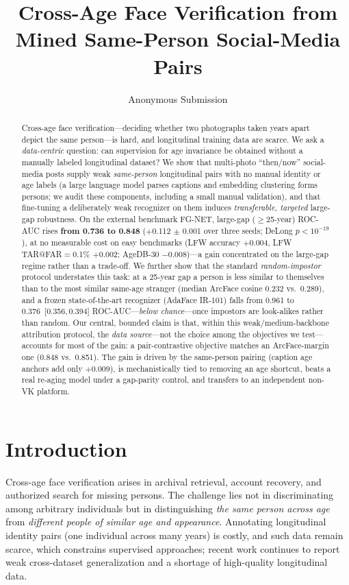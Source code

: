 \documentclass[letterpaper]{article} %
\title{Cross-Age Face Verification from Mined Same-Person Social-Media Pairs}
\author{
    Anonymous Submission
}
\begin{document}
\maketitle

\begin{abstract}
Cross-age face verification---deciding whether two photographs taken years apart depict the same person---is hard, and longitudinal training data are scarce. We ask a \emph{data-centric} question: can supervision for age invariance be obtained without a manually labeled longitudinal dataset? We show that multi-photo ``then/now'' social-media posts supply weak \emph{same-person} longitudinal pairs with no manual identity or age labels (a large language model parses captions and embedding clustering forms persons; we audit these components, including a small manual validation), and that fine-tuning a deliberately weak recognizer on them induces \emph{transferable, targeted} large-gap robustness. On the external benchmark FG-NET, large-gap ($\geq$25-year) ROC-AUC rises \textbf{from 0.736 to 0.848} ($+$0.112 $\pm$ 0.001 over three seeds; DeLong $p<10^{-19}$), at no measurable cost on easy benchmarks (LFW accuracy $+$0.004, LFW TAR@FAR$=$0.1\% $+$0.002; AgeDB-30 $-$0.008)---a gain concentrated on the large-gap regime rather than a trade-off. We further show that the standard \emph{random-impostor} protocol understates this task: at a 25-year gap a person is less similar to themselves than to the most similar same-age stranger (median ArcFace cosine 0.232 vs.\ 0.289), and a frozen state-of-the-art recognizer (AdaFace IR-101) falls from 0.961 to 0.376~[0.356,\,0.394] ROC-AUC---\emph{below chance}---once impostors are look-alikes rather than random. Our central, bounded claim is that, within this weak/medium-backbone attribution protocol, the \emph{data source}---not the choice among the objectives we test---accounts for most of the gain: a pair-contrastive objective matches an ArcFace-margin one (0.848 vs.\ 0.851). The gain is driven by the same-person pairing (caption age anchors add only $+$0.009), is mechanistically tied to removing an age shortcut, beats a real re-aging model under a gap-parity control, and transfers to an independent non-VK platform.
\end{abstract}

\section{Introduction}\label{sec:intro}
Cross-age face verification arises in archival retrieval, account recovery, and authorized search for missing persons. The challenge lies not in discriminating among arbitrary individuals but in distinguishing \emph{the same person across age} from \emph{different people of similar age and appearance}. Annotating longitudinal identity pairs (one individual across many years) is costly, and such data remain scarce, which constrains supervised approaches; recent work continues to report weak cross-dataset generalization and a shortage of high-quality longitudinal data.
\end{document}
